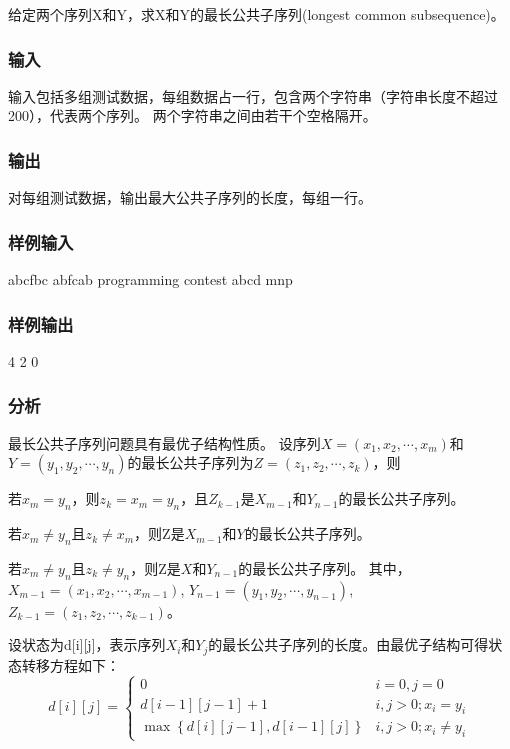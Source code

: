 给定两个序列X和Y，求X和Y的最长公共子序列(longest common subsequence)。

\subsubsection{输入}
输入包括多组测试数据，每组数据占一行，包含两个字符串（字符串长度不超过200），代表两个序列。
两个字符串之间由若干个空格隔开。

\subsubsection{输出}
对每组测试数据，输出最大公共子序列的长度，每组一行。

\subsubsection{样例输入}
\begin{Code}
abcfbc abfcab
programming contest 
abcd mnp
\end{Code}

\subsubsection{样例输出}
\begin{Code}
4
2
0
\end{Code}

\subsubsection{分析}
最长公共子序列问题具有最优子结构性质。
设序列$X=(x_1,x_2,\cdots,x_m)$和$Y=(y_1,y_2,\cdots,y_n)$的最长公共子序列为$Z=(z_1,z_2,\cdots,z_k)$，则
\begindot
\item 若$x_m=y_n$，则$z_k=x_m=y_n$，且$Z_{k-1}$是$X_{m-1}$和$Y_{n-1}$的最长公共子序列。
\item 若$x_m \neq y_n$且$z_k \neq x_m$，则Z是$X_{m-1}$和$Y$的最长公共子序列。
\item 若$x_m \neq y_n$且$z_k \neq y_n$，则Z是$X$和$Y_{n-1}$的最长公共子序列。
\myenddot
其中，$X_{m-1}=(x_1,x_2,\cdots,x_{m-1})$, $Y_{n-1}=(y_1,y_2,\cdots,y_{n-1})$, $Z_{k-1}=(z_1,z_2,\cdots,z_{k-1})$。

设状态为d[i][j]，表示序列$X_i$和$Y_j$的最长公共子序列的长度。由最优子结构可得状态转移方程如下：
$$
d[i][j]=\begin{cases}
0 & i=0,j=0\\
d[i-1][j-1]+1 & i,j>0; x_i=y_i \\
\max\left\{d[i][j-1],d[i-1][j]\right\} & i,j>0; x_i \neq y_i
\end{cases}
$$

